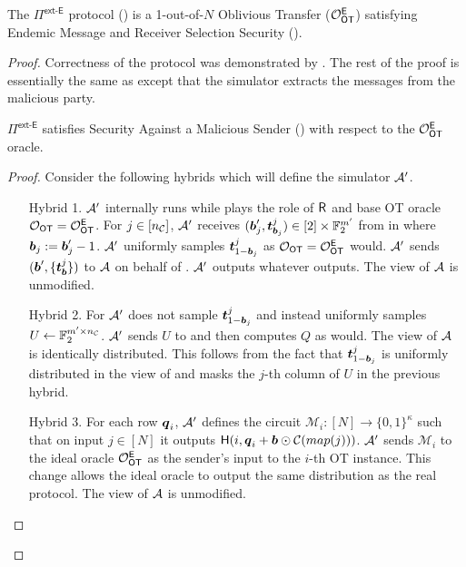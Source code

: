 \begin{lemma}\label{lem:ext-E}
	The $\Pi^{\textsf{ext-E}}$ protocol () is a 1-out-of-$N$ Oblivious Transfer ($\mathcal{O}_{\mathsf{OT}}^\mathsf{E}$) satisfying Endemic Message and Receiver Selection Security ().
\end{lemma}
\begin{proof}
	Correctness of the protocol was demonstrated by \cite{RSA:OrrOrsSch17}. The rest of the proof is essentially the same as \cite{RSA:OrrOrsSch17} except that the simulator extracts the messages from the malicious party.
	\begin{claim}\label{claim:ext-E-MalSender}
		$\Pi^\textsf{ext-E}$ satisfies Security Against a Malicious Sender () with respect to the $\mathcal{O}_{\mathsf{OT}}^\mathsf{E}$ oracle.
	\end{claim}
	\begin{proof}
		Consider the following hybrids which will define the simulator $\mathcal{A}'$. 
		\begin{enumerate}[leftmargin=1.8cm]
			\item[Hybrid 1.] $\mathcal{A}'$ internally runs \Adv while plays the role of $\mathsf{R}$ and base OT oracle $\mathcal{O}_{\mathsf{OT}}=\mathcal{O}_{\mathsf{OT}}^\mathsf{E}$. For $j\in[{n_\mathcal{C}}]$, $\mathcal{A}'$ receives $(\boldsymbol{b}'_j,\boldsymbol{t}^j_{\boldsymbol{b}_j})\in [2]\times \mathbb{F}^{m'}_2$ from \Adv in  where $\boldsymbol{b}_j:=\boldsymbol{b}_j'-1$. $\mathcal{A}'$ uniformly samples $\boldsymbol{t}^j_{1-\boldsymbol{b}_j}$ as $\mathcal{O}_{\mathsf{OT}}=\mathcal{O}_{\mathsf{OT}}^\mathsf{E}$ would. $\mathcal{A}'$ sends $(\boldsymbol{b}', \{\boldsymbol{t}^j_{\boldsymbol{b}}\})$ to $\mathcal{A}$ on behalf of \OOT. $\mathcal{A}'$ outputs whatever \Adv outputs. The view of $\mathcal{A}$ is unmodified.
			
			\item[Hybrid 2.] For  $\mathcal{A}'$ does not sample $\boldsymbol{t}^j_{1-\boldsymbol{b}_j}$ and instead uniformly samples $U\gets\mathbb{F}^{m'\times {n_\mathcal{C}}}_2$. $\mathcal{A}'$ sends $U$ to \Adv and then computes $Q$ as \send would. The view of $\mathcal{A}$ is identically distributed. This follows from the fact that $\boldsymbol{t}^j_{1-\boldsymbol{b}_j}$ is uniformly distributed in the view of \Adv and masks the $j$-th column of $U$ in the previous hybrid. 
			
			\item[Hybrid 3.]\label{hybrid:malSendExtract} For each row $\boldsymbol{q}_i$, $\mathcal{A}'$ defines the circuit $\mathcal{M}_i:[N]\rightarrow\{0,1\}^\kappa$ such that on input $j\in[N]$ it outputs $\mathsf{H}(i, \boldsymbol{q}_i+\boldsymbol{b}\odot \mathcal{C}(map(j)))$. $\mathcal{A}'$ sends $\mathcal{M}_i$ to the ideal oracle $\mathcal{O}_{\mathsf{OT}}^\mathsf{E}$ as the sender's input to the $i$-th OT instance. This change allows the ideal oracle to output the same distribution as the real protocol. The view of $\mathcal{A}$ is unmodified.
			

\end{enumerate}
\end{proof}
\end{proof}
